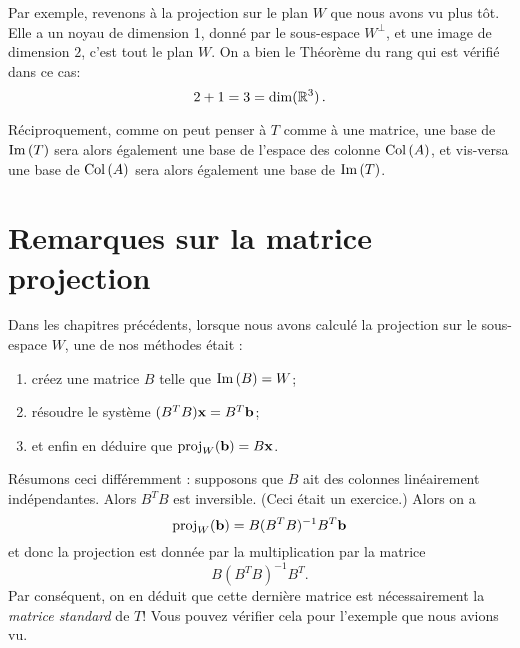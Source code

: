 Par exemple, revenons à la projection sur le plan $W$ que nous avons vu
plus tôt. Elle a un noyau de dimension 1, donn\'e par le sous-espace $W^\perp$,
et une image de dimension $2$, c'est tout le plan $W$. On a bien le Théorème du rang qui est vérifié dans ce cas: 
$$2+1=3 = \dim(\mathbb{R}^3)\,.$$


Réciproquement, comme on peut penser à $T$ comme à une matrice, une base de $\operatorname{Im}\,(T)$ sera alors également une base de l'espace des colonne $\operatorname{Col\,}(A)$, et vis-versa une base de $\operatorname{Col\,}(A)$ sera alors également une base de $\operatorname{Im}\,(T)$.

\section{Remarques sur la matrice projection}
Dans les chapitres précédents, lorsque nous avons calculé la projection sur le sous-espace $W$, une de nos méthodes était :
\begin{enumerate}[(1)]
\item créez une matrice $B$ telle que $\operatorname{Im}\,(B) = W$;
\item r\'esoudre le système $(B^TB)\mathbf{x} = B^T\mathbf{b}$; 
\item et enfin en déduire que $\operatorname{proj}_W(\mathbf{b}) = B\mathbf{x}$.
\end{enumerate}
Résumons ceci différemment :  supposons que $B$ ait des colonnes linéairement indépendantes. Alors $B^TB$ est inversible.  (Ceci était un exercice.)
Alors on a
$$
\operatorname{proj}_W(\mathbf{b}) = B(B^TB)^{-1}B^T\mathbf{b}
$$
et donc la projection est donnée par la multiplication par la matrice
$$
 B(B^TB)^{-1}B^T.
$$
Par conséquent, on en déduit que cette derni\`ere matrice est nécessairement la \emph{matrice standard} de $T$!  Vous pouvez
v\'erifier cela pour l'exemple que nous avions vu.


